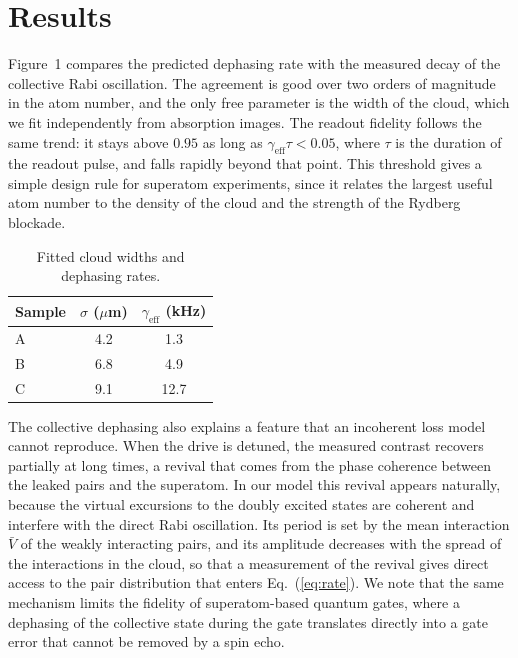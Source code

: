 \documentclass[aps,pra,twocolumn,superscriptaddress,10pt]{revtex4-2}
\begin{document}
\section{Results}

Figure~1 compares the predicted dephasing rate with the measured decay of the
collective Rabi oscillation. The agreement is good over two orders of
magnitude in the atom number, and the only free parameter is the width of the
cloud, which we fit independently from absorption images. The readout
fidelity follows the same trend: it stays above $0.95$ as long as
$\gamma_{\mathrm{eff}} \tau < 0.05$, where $\tau$ is the duration of the
readout pulse, and falls rapidly beyond that point. This threshold gives a
simple design rule for superatom experiments, since it relates the largest
useful atom number to the density of the cloud and the strength of the
Rydberg blockade.

\begin{table}[b]
\caption{Fitted cloud widths and dephasing rates.}
\begin{ruledtabular}
\begin{tabular}{lcc}
Sample & $\sigma$ ($\mu$m) & $\gamma_{\mathrm{eff}}$ (kHz) \\
\hline
A & 4.2 & 1.3 \\
B & 6.8 & 4.9 \\
C & 9.1 & 12.7 \\
\end{tabular}
\end{ruledtabular}
\end{table}

The collective dephasing also explains a feature that an incoherent loss
model cannot reproduce. When the drive is detuned, the measured contrast
recovers partially at long times, a revival that comes from the phase
coherence between the leaked pairs and the superatom. In our model this
revival appears naturally, because the virtual excursions to the doubly
excited states are coherent and interfere with the direct Rabi oscillation.
Its period is set by the mean interaction $\bar{V}$ of the weakly interacting
pairs, and its amplitude decreases with the spread of the interactions in the
cloud, so that a measurement of the revival gives direct access to the pair
distribution that enters Eq.~(\ref{eq:rate}). We note that the same mechanism
limits the fidelity of superatom-based quantum gates, where a dephasing of the
collective state during the gate translates directly into a gate error that
cannot be removed by a spin echo.
\end{document}
